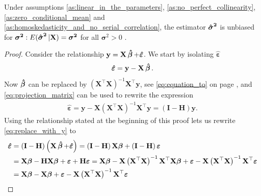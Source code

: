 \begin{theorem}
    Under assumptions \ref{as:linear_in_the_parameters}, \ref{as:no_perfect_collinearity}, \ref{as:zero_conditional_mean} and \ref{as:homoskedasticity_and_no_serial_correlation}, the estimator $\operatorname{\mathbf{\hat{\boldsymbol{\sigma}}^2}}$ is unbiased for $\boldsymbol{\sigma^2}:E(\operatorname{\mathbf{\hat{\boldsymbol{\sigma}}^2}}|\mathbf{X}) = \boldsymbol{\sigma^2}$ for all $\boldsymbol{\sigma}^2 > 0$ \cite[p. 813]{Wooldridge2012}.
\end{theorem}
\begin{proof}
    Consider the relationship $\mathbf{y} = \mathbf{X}\operatorname{\boldsymbol{\hat{\beta}}} + \boldsymbol{\hat{\varepsilon}}$.
    We start by isolating $\boldsymbol{\hat{\varepsilon}}$
    \begin{align*}
        \boldsymbol{\hat{\varepsilon}} = \mathbf{y} - \mathbf{X}\operatorname{\boldsymbol{\hat{\beta}}}.
    \end{align*}
    Now $\operatorname{\boldsymbol{\hat{\beta}}}$ can be replaced by $\left(\mathbf{X}^\top\mathbf{X}\right)^{-1}\mathbf{X}^\top\mathbf{y}$, see \eqref{eq:equation_to} on page \pageref{eq:equation_to}, and \eqref{eq:projection_matrix} can be used to rewrite the expression 
    \begin{align}
        \boldsymbol{\hat{\varepsilon}} = \mathbf{y} - \mathbf{X}\left(\mathbf{X}^\top\mathbf{X}\right)^{-1}\mathbf{X}^\top\mathbf{y}
        = \left(\mathbf{I} - \mathbf{H}\right)\mathbf{y}. \label{eq:replace_with_y}
    \end{align}
    Using the relationship stated at the beginning of this proof lets us rewrite \eqref{eq:replace_with_y} to
    \begin{align*}
        \boldsymbol{\hat{\varepsilon}} &= \left(\mathbf{I} - \mathbf{H}\right)\left(\mathbf{X}\betahat + \boldsymbol{\hat{\varepsilon}}\right)
        = \left(\mathbf{I} - \mathbf{H}\right)\mathbf{X}\boldsymbol{\beta} + \left(\mathbf{I} - \mathbf{H}\right)\boldsymbol{\varepsilon} \\
        &= \mathbf{X}\boldsymbol{\beta} - \mathbf{H}\mathbf{X}\boldsymbol{\beta} + \boldsymbol{\varepsilon} + \mathbf{H}\boldsymbol{\varepsilon}
        = \mathbf{X}\boldsymbol{\beta} - \mathbf{X}\left(\mathbf{X}^\top\mathbf{X}\right)^{-1}\mathbf{X}^\top\mathbf{X}\boldsymbol{\beta} + \boldsymbol{\varepsilon} - \mathbf{X}\left(\mathbf{X}^\top\mathbf{X}\right)^{-1}\mathbf{X}^\top\boldsymbol{\varepsilon} \\
        &= \mathbf{X}\boldsymbol{\beta} - \mathbf{X}\boldsymbol{\beta} + \boldsymbol{\varepsilon} - \mathbf{X}\left(\mathbf{X}^\top\mathbf{X}\right)^{-1}\mathbf{X}^\top\boldsymbol{\varepsilon} 

\end{align*}
\end{proof}
